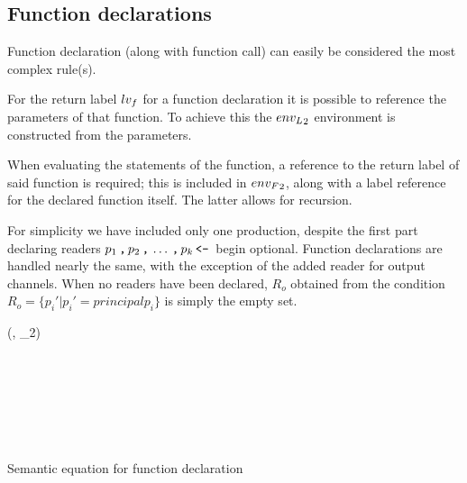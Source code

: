 \subsection{Function declarations}
Function declaration (along with function call) can easily be considered the most complex rule(s).

For the return label $lv_f$ for a function declaration it is possible to reference the parameters of that function.
To achieve this the ${env_L}_2$ environment is constructed from the parameters.

When evaluating the statements of the function, a reference to the return label of said function is required; this is included in ${env_F}_2$, along with a label reference for the declared function itself.
The latter allows for recursion.

For simplicity we have included only one production, despite the first part declaring readers $p_1 \, \texttt{,} \, p_2 \, \texttt{,} \, \dots \, \texttt{,} \, p_k \, \texttt{<-} \,$ begin optional.
Function declarations are handled nearly the same, with the exception of the added reader for output channels.
When no readers have been declared, $R_o$ obtained from the condition $R_o = \{ p_i' | p_i' = principal p_i \}$ is simply the empty set.

\begin{table}[H]
\begin{semanticequations}
{(\icstr, \ienvF_2)}{
   \\
   \\
   \\
   \\
   \\
   \\
   \\
}
\end{semanticequations}
\caption{Semantic equation for function declaration}
\label{cstr:functiondeclaration}
\end{table}

